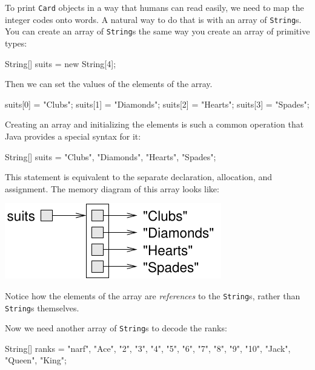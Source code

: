 \documentclass[12pt]{book}
\theoremstyle{exercise}
\newcommand{\java}[1]{\verb"#1"}
\newcommand{\java}[1]{\lstinline{#1}} %
\begin{document}

To print \java{Card} objects in a way that humans can read easily, we need to map the integer codes onto words.
A natural way to do that is with an array of \java{String}s.
You can create an array of \java{String}s the same way you create an array of primitive types:

\begin{code}
    String[] suits = new String[4];
\end{code}

Then we can set the values of the elements of the array.

\begin{code}
    suits[0] = "Clubs";
    suits[1] = "Diamonds";
    suits[2] = "Hearts";
    suits[3] = "Spades";
\end{code}

Creating an array and initializing the elements is such a common operation that Java provides a special syntax for it:

\begin{code}
    String[] suits = {"Clubs", "Diamonds", "Hearts", "Spades"};
\end{code}


This statement is equivalent to the separate declaration, allocation, and assignment.
The memory diagram of this array looks like:

\begin{center}
\includegraphics{figs/stringarray.pdf}
\end{center}


Notice how the elements of the array are {\em references} to the \java{String}s, rather than \java{String}s themselves.

Now we need another array of \java{String}s to decode the ranks:

\begin{code}
    String[] ranks = {"narf", "Ace", "2", "3", "4", "5", "6",
               "7", "8", "9", "10", "Jack", "Queen", "King"};
\end{code}
\end{document}
